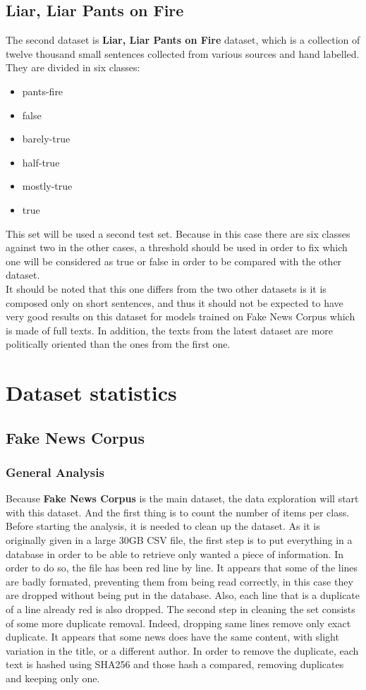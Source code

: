 \subsection{Liar, Liar Pants on Fire}
The second dataset is \textbf{Liar, Liar Pants on Fire} dataset\cite{Wang2017}, which is a collection of twelve thousand small sentences collected from various sources and hand labelled. They are divided in six classes:
\begin{itemize}
  \item pants-fire
  \item false
  \item barely-true
  \item half-true
  \item mostly-true
  \item true
\end{itemize} 
This set will be used a second test set. Because in this case there are six classes against two in the other cases, a threshold should be used in order to fix which one will be considered as true or false in order to be compared with the other dataset.  \\

It should be noted that this one differs from the two other datasets is it is composed only on short sentences, and thus it should not be expected to have very good results on this dataset for models trained on Fake News Corpus which is made of full texts. In addition, the texts from the latest dataset are more politically oriented than the ones from the first one. 
\section{Dataset statistics}
\subsection{Fake News Corpus}
\subsubsection{General Analysis}
 Because \textbf{Fake News Corpus} is the main dataset, the data exploration will start with this dataset. And the first thing is to count the number of items per class. Before starting the analysis, it is needed to clean up the dataset. As it is originally given in a large 30GB CSV file, the first step is to put everything in a database in order to be able to retrieve only wanted a piece of information. In order to do so, the file has been red line by line. It appears that some of the lines are badly formated, preventing them from being read correctly, in this case they are dropped without being put in the database. Also, each line that is a duplicate of a line already red is also dropped. The second step in cleaning the set consists of some more duplicate removal. Indeed, dropping same lines remove only exact duplicate. It appears that some news does have the same content, with slight variation in the title, or a different author. In order to remove the duplicate, each text is hashed using SHA256 and those hash a compared, removing duplicates and keeping only one. \\

